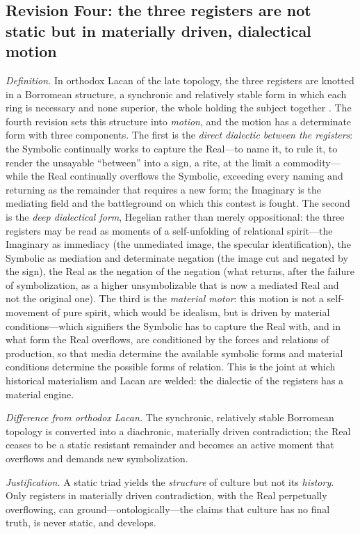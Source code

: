 \subsection*{Revision Four: the three registers are not static but in materially driven, dialectical motion}

\emph{Definition.} In orthodox Lacan of the late topology, the three registers are knotted in a Borromean structure, a synchronic and relatively stable form in which each ring is necessary and none superior, the whole holding the subject together \parencite{lacan1975rsi}. The fourth revision sets this structure into \emph{motion}, and the motion has a determinate form with three components. The first is the \emph{direct dialectic between the registers}: the Symbolic continually works to capture the Real---to name it, to rule it, to render the unsayable ``between'' into a sign, a rite, at the limit a commodity---while the Real continually overflows the Symbolic, exceeding every naming and returning as the remainder that requires a new form; the Imaginary is the mediating field and the battleground on which this contest is fought. The second is the \emph{deep dialectical form}, Hegelian rather than merely oppositional: the three registers may be read as moments of a self-unfolding of relational spirit---the Imaginary as immediacy (the unmediated image, the specular identification), the Symbolic as mediation and determinate negation (the image cut and negated by the sign), the Real as the negation of the negation (what returns, after the failure of symbolization, as a higher unsymbolizable that is now a mediated Real and not the original one). The third is the \emph{material motor}: this motion is not a self-movement of pure spirit, which would be idealism, but is driven by material conditions---which signifiers the Symbolic has to capture the Real with, and in what form the Real overflows, are conditioned by the forces and relations of production, so that media determine the available symbolic forms and material conditions determine the possible forms of relation. This is the joint at which historical materialism and Lacan are welded: the dialectic of the registers has a material engine.

\emph{Difference from orthodox Lacan.} The synchronic, relatively stable Borromean topology is converted into a diachronic, materially driven contradiction; the Real ceases to be a static resistant remainder and becomes an active moment that overflows and demands new symbolization.

\emph{Justification.} A static triad yields the \emph{structure} of culture but not its \emph{history}. Only registers in materially driven contradiction, with the Real perpetually overflowing, can ground---ontologically---the claims that culture has no final truth, is never static, and develops.

